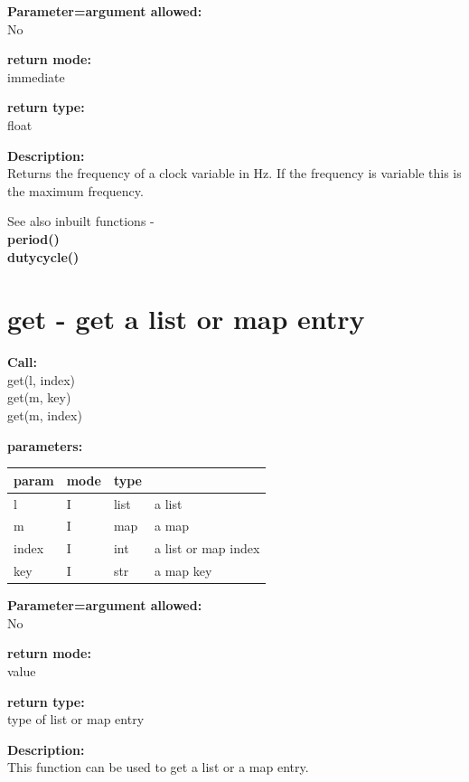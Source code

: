         {\bf Parameter=argument allowed:} \\
        No
        
        {\bf return mode:} \\
        immediate

        {\bf return type:} \\
        float
        
        {\bf Description:} \\
        Returns the frequency of a clock variable in Hz. If the frequency
        is variable this is the maximum frequency.
        
        See also inbuilt functions - \\
        {\bf period()}  \\
        {\bf dutycycle()} 


    \section{get - get a list or map entry}\label{sec:ifget}
        
        {\bf Call:} \\
        get(l, index) \\
        get(m, key) \\
        get(m, index)
        
        {\bf parameters:} \\
        \begin{tabular}{| l | l | l | l |}
        \hline
        param  & mode & type & \\
        \hline \hline
        l     & I & list & a list \\ \hline
        m     & I & map  & a map \\ \hline
        index & I & int  & a list or map index \\ \hline
        key   & I & str  & a map key \\ \hline
        \end{tabular}
        
        {\bf Parameter=argument allowed:} \\
        No
        
        {\bf return mode:} \\
        value

        {\bf return type:} \\
        type of list or map entry
        
        {\bf Description:} \\
        This function can be used to get a list or a map entry.
        
